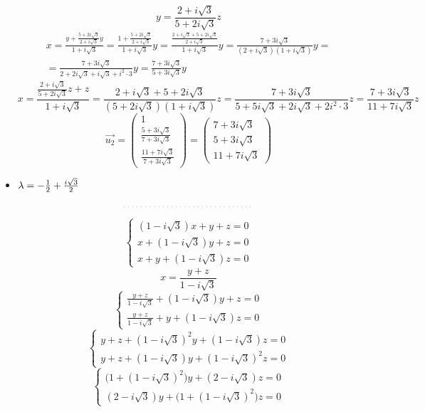 \begin{itemize}
    $$ y = \frac{2 + i\sqrt3}{5 + 2i\sqrt3} z $$
    \begin{multline*}
        x = \frac{y + \frac{5 + 2i\sqrt3}{2 + i\sqrt3}y}{1 + i\sqrt3} = \frac{1 + \frac{5 + 2i\sqrt3}{2 + i\sqrt3}}{1 + i\sqrt3} y = \frac{\frac{2 + i\sqrt3 + 5 + 2i\sqrt3}{2 + i\sqrt3}}{1 + i\sqrt3}y = \frac{7 + 3i\sqrt3}{(2 + i\sqrt3)(1 + i\sqrt3)}y = \\
        = \frac{7 + 3i\sqrt3}{2 + 2i\sqrt3 + i\sqrt3 + i^2 \cdot 3}y = \frac{7 + 3i\sqrt3}{5 + 3i\sqrt3}y
    \end{multline*}
    $$ x = \frac{\frac{2 + i\sqrt3}{5 + 2i\sqrt3}z + z}{1 + i\sqrt3} = \frac{2 + i\sqrt3 + 5 + 2i\sqrt3}{(5 + 2i\sqrt3)(1 + i\sqrt3)}z = \frac{7 + 3i\sqrt3}{5 + 5i\sqrt3 + 2i\sqrt3 + 2 i^2 \cdot 3}z = \frac{7 + 3i\sqrt3}{11 + 7i\sqrt3}z $$
    $$ \vec{u_2} =
    \begin{pmatrix}
        1 \\
        \frac{5 + 3i\sqrt3}{7 + 3i\sqrt3} \\
        \frac{11 + 7i\sqrt3}{7 + 3i\sqrt3}
    \end{pmatrix} =
    \begin{pmatrix}
    	7 + 3i\sqrt3 \\
        5 + 3i\sqrt3 \\
        11 + 7i\sqrt3
    \end{pmatrix} $$
    \item $ \lambda = -\half + \half[i\sqrt3] $
    $$ \widedots $$
    $$
    \begin{cases}
    	(1 - i\sqrt3)x + y + z = 0 \\
        x + (1 - i\sqrt3)y + z = 0 \\
        x + y + (1 - i\sqrt3)z = 0
    \end{cases} $$
    $$ x = \frac{y + z}{1 - i\sqrt3} $$
    $$
    \begin{cases}
    	\frac{y + z}{1 - i\sqrt3} + (1 - i\sqrt3)y + z = 0 \\
        \frac{y + z}{1 - i\sqrt3} + y + (1 - i\sqrt3)z = 0
    \end{cases} $$
    $$
    \begin{cases}
        y + z + (1 - i\sqrt3)^2 y + (1 - i\sqrt3)z = 0 \\
        y + z + (1 - i\sqrt3)y + (1 - i\sqrt3)^2 z = 0
    \end{cases} $$
    $$
    \begin{cases}
    	\bigg( 1 + (1 - i\sqrt3)^2 \bigg)y + (2 - i\sqrt3)z = 0 \\
        (2 - i\sqrt3)y + \bigg( 1 + (1 - i\sqrt3)^2 \bigg)z = 0

\end{cases}$$
\end{itemize}
